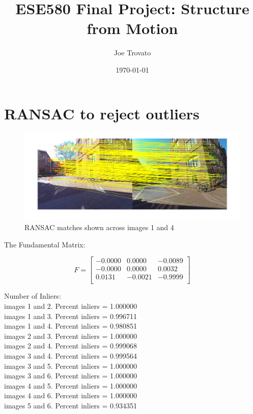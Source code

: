 \documentclass{article}
\begin{document}
\title{ESE580 Final Project: Structure from Motion}
\author{Joe Trovato}
\date{\today}
\maketitle
\setlength{\parindent}{10ex}

\section{RANSAC to reject outliers}

\begin{figure}[!h]
\centering
\includegraphics[width = \textwidth]{ransacmontage.png}
\caption{RANSAC matches shown across images 1 and 4}
\end{figure}


The Fundamental Matrix:

$$F = \begin{bmatrix}

   -0.0000   & 0.0000 &  -0.0089 \\
   -0.0000  &  0.0000   & 0.0032\\
    0.0131  & -0.0021  & -0.9999\\ \end{bmatrix}$$

Number of Inliers:\\
images 1 and 2. Percent inliers = 1.000000 \\
images 1 and 3. Percent inliers = 0.996711 \\
images 1 and 4. Percent inliers = 0.980851 \\
images 2 and 3. Percent inliers = 1.000000 \\
images 2 and 4. Percent inliers = 0.999068 \\
images 3 and 4. Percent inliers = 0.999564 \\
images 3 and 5. Percent inliers = 1.000000 \\
images 3 and 6. Percent inliers = 1.000000 \\
images 4 and 5. Percent inliers = 1.000000 \\
images 4 and 6. Percent inliers = 1.000000 \\
images 5 and 6. Percent inliers = 0.934351 \\
\end{document}
